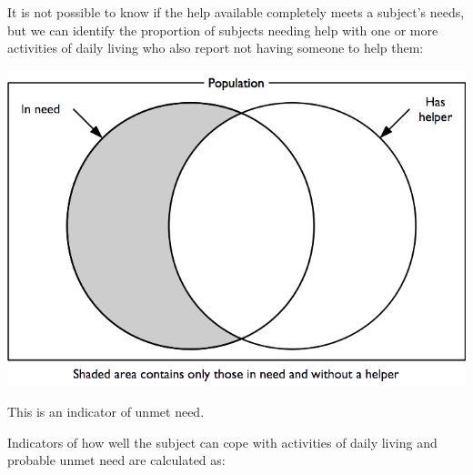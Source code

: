 \documentclass[12pt,a4paper]{book}
\theoremstyle{definition}
\theoremstyle{definition}
\theoremstyle{definition}
\theoremstyle{remark}
\begin{document}
It is not possible to know if the help available completely meets a
subject's needs, but we can identify the proportion of subjects needing
help with one or more activities of daily living who also report not
having someone to help them:

\begin{center}\includegraphics{figures/indicators17} \end{center}

This is an indicator of unmet need.

Indicators of how well the subject can cope with activities of daily
living and probable unmet need are calculated as:
\end{document}
